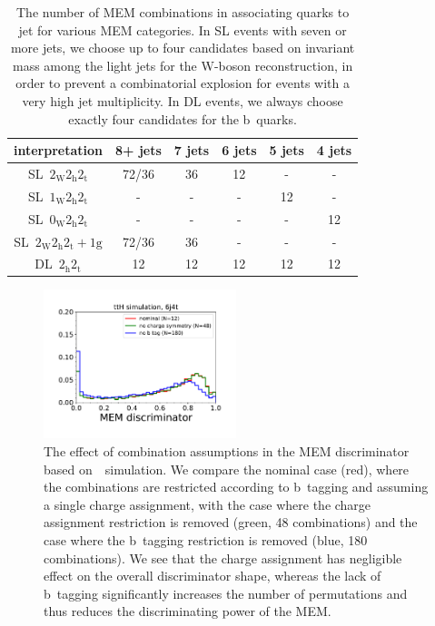 \begin{table}[h!]
\begin{center}
\begin{tabular}{c|ccccc}
\hline
interpretation& 8+ jets & 7 jets & 6 jets & 5 jets & 4 jets \\
\hline
SL~$2_{\mathrm{W}} 2_{\mathrm{h}} 2_{\mathrm{t}}$ & 72/36 & 36 & 12 & - & - \\
SL~$1_{\mathrm{W}} 2_{\mathrm{h}} 2_{\mathrm{t}}$ & - & - & - & 12 & -\\
SL~$0_{\mathrm{W}} 2_{\mathrm{h}} 2_{\mathrm{t}}$ & - & - & - & - & 12 \\
SL~$2_{\mathrm{W}} 2_{\mathrm{h}} 2_{\mathrm{t}}+1\mathrm{g}$ & 72/36 & 36 & - & - & - \\
\hline
DL~$2_{\mathrm{h}} 2_{\mathrm{t}}$ & 12 & 12 & 12 & 12 & 12 \\
\hline
\hline
\end{tabular}
\caption[The number of transfer function combinations in different categories]{The number of MEM combinations in associating quarks to jet for various MEM categories. In SL events with seven or more jets, we choose up to four candidates based on invariant mass among the light jets for the W-boson reconstruction, in order to prevent a combinatorial explosion for events with a very high jet multiplicity. In DL events, we always choose exactly four candidates for the b~quarks.}
\label{tab:category_combinations}
\end{center}
\end{table}

\begin{figure}
\begin{centering}
\includegraphics[width=0.5\textwidth]{figures/mem/mem_assumptions.pdf}
\caption[The effect of combinations assumptions in the MEM]{The effect of combination assumptions in the MEM discriminator based on~\ttHbb~simulation. We compare the nominal case (red), where the combinations are restricted according to b~tagging and assuming a single charge assignment, with the case where the charge assignment restriction is removed (green, 48 combinations) and the case where the b~tagging restriction is removed (blue, 180 combinations). We see that the charge assignment has negligible effect on the overall discriminator shape, whereas the lack of b~tagging significantly increases the number of permutations and thus reduces the discriminating power of the MEM.}
\label{fig:mem_assumptions}
\end{centering}
\end{figure}

